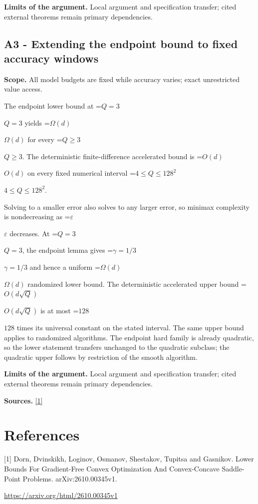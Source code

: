 \documentclass[10pt,a4paper]{article}
\newcommand{\AtlasMath}[1]{\par\begingroup\centering\setbox0=\hbox{$\displaystyle #1$}\ifdim\wd0>1.4\linewidth\typeout{ATLAS WIDE FORMULA: \the\wd0}\fi\ifdim\wd0>\linewidth\resizebox{\linewidth}{!}{\box0}\else\box0\fi\par\endgroup}
\newcommand{\AtlasInlineMath}[1]{\begingroup\setbox0=\hbox{$#1$}\ifdim\wd0>.4\linewidth\endgroup\AtlasMath{#1}\else\endgroup$#1$\fi}
\begin{document}
\textbf{Limits of the argument.} Local argument and specification transfer; cited external theorems remain primary dependencies.

\subsection{A3 - Extending the endpoint bound to fixed accuracy windows}
\textbf{Scope.} All model budgets are fixed while accuracy varies; exact unrestricted value access.

The endpoint lower bound at \AtlasInlineMath{Q=3} yields \AtlasInlineMath{\Omega(d)} for every \AtlasInlineMath{Q\ge3}. The deterministic finite-difference accelerated bound is \AtlasInlineMath{O(d)} on every fixed numerical interval \AtlasInlineMath{4\le Q\le128^2}.

Solving to a smaller error also solves to any larger error, so minimax complexity is nondecreasing as \AtlasInlineMath{\varepsilon} decreases. At \AtlasInlineMath{Q=3}, the endpoint lemma gives \AtlasInlineMath{\gamma=1/3} and hence a uniform \AtlasInlineMath{\Omega(d)} randomized lower bound. The deterministic accelerated upper bound \AtlasInlineMath{O(d\sqrt Q)} is at most \AtlasInlineMath{128} times its universal constant on the stated interval. The same upper bound applies to randomized algorithms. The endpoint hard family is already quadratic, so the lower statement transfers unchanged to the quadratic subclass; the quadratic upper follows by restriction of the smooth algorithm.

\textbf{Limits of the argument.} Local argument and specification transfer; cited external theorems remain primary dependencies.

\textbf{Sources.} \href{https://arxiv.org/html/2610.00345v1}{[1]}

\section{References}
[1] Dorn, Dvinskikh, Loginov, Osmanov, Shestakov, Tupitsa and Gasnikov. Lower Bounds For Gradient-Free Convex Optimization And Convex-Concave Saddle-Point Problems. arXiv:2610.00345v1.

\url{https://arxiv.org/html/2610.00345v1}
\end{document}
